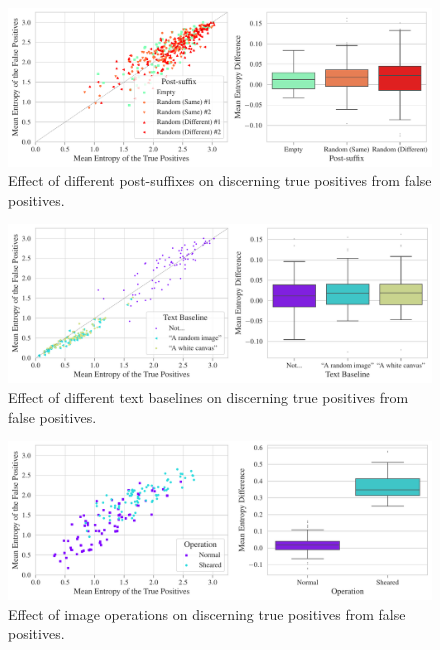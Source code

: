 \begin{figure}[H]
    \centering
    \includegraphics[width=\textwidth]{images/post-suffix_adversarial_2.pdf}
    \caption{Effect of different post-suffixes on discerning true positives from false positives.}
    \label{fig:post-suffix-adversarial}
\end{figure}


\begin{figure}[H]
    \centering
    \includegraphics[width=\textwidth]{images/baseline_adversarial_2.pdf}
    \caption{Effect of different text baselines on discerning true positives from false positives.}
    \label{fig:baseline-adversarial}
\end{figure}

\begin{figure}[H]
    \centering
    \includegraphics[width=\textwidth]{images/texturing-operations_adversarial.pdf}
    \caption{Effect of image operations on discerning true positives from false positives.}
    \label{fig:texturing-operations-adversarial}
\end{figure}

